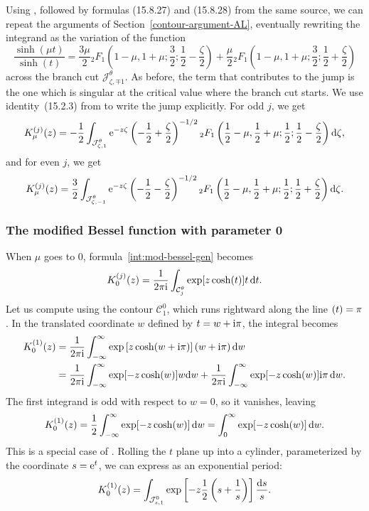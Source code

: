 \documentclass[pdftex]{sigma}
\let\Im\relax
\DeclareMathOperator{\Im}{Im}
\numberwithin{equation}{section}
\begin{document}
Using \cite[formula~(15.8.4)]{dlmf}, followed by formulas (15.8.27) and (15.8.28) from the same source, we can repeat the arguments of Section~\ref{contour-argument-AL}, eventually rewriting the integrand as the variation of the function
\[ \frac{\sinh(\mu t)}{\sinh(t)} = \frac{3\mu}{2} {}_2F_1\left(1 - \mu, 1 + \mu; \frac{3}{2};\frac{1}{2} - \frac{\zeta}{2}\right) + \frac{\mu}{2} {}_2F_1\left(1 - \mu, 1 + \mu; \frac{3}{2}; \frac{1}{2} + \frac{\zeta}{2}\right) \]
across the branch cut $\mathcal{J}^\theta_{\zeta, \mp 1}$. As before, the term that contributes to the jump is the one which is singular at the critical value where the branch cut starts. We use identity~(15.2.3) from \cite{dlmf} to write the jump explicitly. For odd $j$, we get
\begin{equation}\label{eq: K_j_mu at 1}
 K^{(j)}_\mu(z) = -\frac{1}{2} \int_{\mathcal{J}^\theta_{\zeta, 1}} {\rm e}^{-z\zeta} \left(-\frac{1}{2}+\frac{\zeta}{2}\right)^{-1/2} {}_2F_1\left(\frac{1}{2} - \mu, \frac{1}{2} + \mu; \frac{1}{2}; \frac{1}{2} - \frac{\zeta}{2}\right) {\rm d}\zeta,
\end{equation}
and for even $j$, we get
\[%
 K^{(j)}_\mu(z) = \frac{3}{2} \int_{\mathcal{J}^\theta_{\zeta, -1}} {\rm e}^{-z\zeta} \left(-\frac{1}{2}-\frac{\zeta}{2}\right)^{-1/2} {}_2F_1\left(\frac{1}{2} - \mu, \frac{1}{2} + \mu; \frac{1}{2}; \frac{1}{2} + \frac{\zeta}{2}\right) {\rm d}\zeta.
\]
%
\subsubsection[The modified Bessel function with parameter 0]{The modified Bessel function with parameter 0} \label{sec:bessel-0}

When $\mu$ goes to $0$, formula~\eqref{int:mod-bessel-gen} becomes
\[ K_0^{(j)}(z) = \frac{1}{2 \pi {\rm i}} \int_{\mathcal{C}_j^\theta} \exp[z \cosh(t)] t \,{\rm d}t. \]
Let us compute  using the contour $\mathcal{C}_1^0$, which runs rightward along the line $\Im(t) = \pi$. In the translated coordinate $w$ defined by $t = w + {\rm i}\pi$, the integral becomes
\begin{align*}
K_0^{(1)}(z) & = \frac{1}{2 \pi {\rm i}} \int_{-\infty}^\infty \exp\left[z \cosh(w + {\rm i}\pi)\right] (w + {\rm i}\pi)\,{\rm d}w \\
& = \frac{1}{2 \pi {\rm i}} \int_{-\infty}^\infty \exp[-z \cosh(w)] w {\rm d}w + \frac{1}{2 \pi {\rm i}} \int_{-\infty}^\infty \exp[-z \cosh(w)] {\rm i}\pi\, {\rm d}w.
\end{align*}
The first integrand is odd with respect to $w = 0$, so it vanishes, leaving
\begin{align}
K_0^{(1)}(z) = \frac{1}{2} \int_{-\infty}^\infty \exp [-z \cosh(w) ] \,{\rm d}w = \int_0^\infty \exp[-z \cosh(w)] \,{\rm d}w. \label{int:k0_cosh}
\end{align}
This is a special case of \cite[formula~(10.32.9)]{dlmf}. Rolling the $t$ plane up into a cylinder, parameterized by the coordinate $s = {\rm e}^t$, we can express  as an exponential period:
\[ K_0^{(1)}(z) = \int_{\mathcal{J}^0_{s, 1}} \exp\left[-z \frac{1}{2}\left(s + \frac{1}{s}\right)\right] \frac{{\rm d}s}{s}. \]
\end{document}
